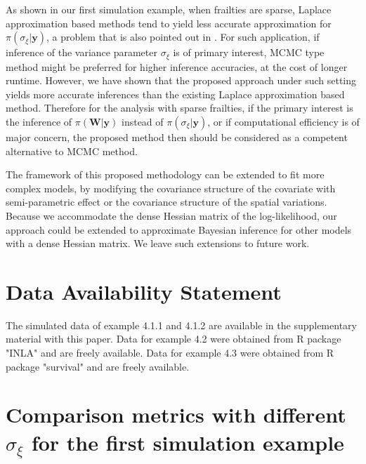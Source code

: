 \documentclass[ba]{imsart}
\begin{document}
As shown in our first simulation example, when frailties are sparse, Laplace approximation based methods tend to yield less accurate approximation for $\pi(\sigma_\xi|\boldsymbol{y})$, a problem that is also pointed out in \cite{Ogden2013ASR}. For such application, if inference of the variance parameter $\sigma_\xi$ is of primary interest, MCMC type method might be preferred for higher inference accuracies, at the cost of longer runtime. However, we have shown that the proposed approach under such setting yields more accurate inferences than the existing Laplace approximation based method. Therefore for the analysis with sparse frailties, if the primary interest is the inference of $\pi(\boldsymbol{W}|\boldsymbol{y})$ instead of $\pi(\sigma_\xi|\boldsymbol{y})$, or if computational efficiency is of major concern, the proposed method then should be considered as a competent alternative to MCMC method.

The framework of this proposed methodology can be extended to fit more complex models, by modifying the covariance structure of the covariate with semi-parametric effect or the covariance structure of the spatial variations. Because we accommodate the dense Hessian matrix of the log-likelihood, our approach could be extended to approximate Bayesian inference for other models with a dense Hessian matrix. We leave such extensions to future work.



\section*{Data Availability Statement}
The simulated data of example 4.1.1 and 4.1.2 are available in the supplementary material with this paper. Data for example 4.2 were obtained from R package "INLA" \citep{inla} and are freely available.
Data for example 4.3 were obtained from R package "survival" \citep{survival-package} and are freely available. 

\clearpage

\appendix

\section{Comparison metrics with different $\sigma_\xi$ for the first simulation example}
\end{document}
